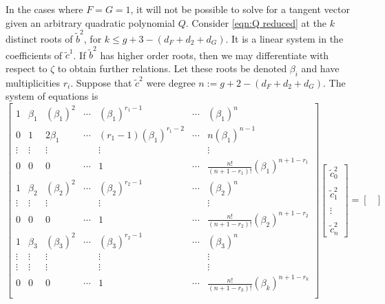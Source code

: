 In the cases where $F=G=1$, it will not be possible to solve for a tangent vector given an arbitrary quadratic polynomial $Q$. Consider \eqref{eqn:Q reduced} at the $k$ distinct roots of $\tilde{b}^2$, for $k \leq g + 3 - (d_F + d_2 + d_G)$. It is a linear system in the coefficients of $\tilde{c}^1$. If $\tilde{b}^2$ has higher order roots, then we may differentiate with respect to $ζ$ to obtain further relations. Let these roots be denoted $β_i$ and have multiplicities $r_i$. Suppose that $\tilde{c}^2$ were degree $n := g + 2 - (d_F + d_2 + d_G)$. The system of equations is
\[
\begin{bmatrix}
1 & β_1 & (β_1)^2 & \cdots & (β_1)^{r_1-1} & \cdots & (β_1)^{n} \\
0 & 1 & 2β_1 & \cdots & (r_1-1)(β_1)^{r_1-2} & \cdots & n(β_1)^{n-1} \\
\vdots & \vdots & \vdots & & \vdots & & \vdots \\
0 & 0 & 0 & \cdots & 1 & \cdots & \frac{n!}{(n+1 - r_1)!}(β_1)^{n+1-r_1} \\
1 & β_2 & (β_2)^2 & \cdots & (β_2)^{r_2-1} & \cdots & (β_2)^{n} \\
\vdots & \vdots & \vdots & & \vdots & & \vdots \\
0 & 0 & 0 & \cdots & 1 & \cdots & \frac{n!}{(n+1 - r_2)!}(β_2)^{n+1-r_2} \\
1 & β_3 & (β_3)^2 & \cdots & (β_3)^{r_2-1} & \cdots & (β_3)^{n} \\
\vdots & \vdots & \vdots & & \vdots & & \vdots \\
\vdots & \vdots & \vdots & & \vdots & & \vdots \\
0 & 0 & 0 & \cdots & 1 & \cdots & \frac{n!}{(n+1 - r_k)!}(β_k)^{n+1-r_k} \\
\end{bmatrix}
\begin{bmatrix}
\tilde{c}^2_0 \\~\\ \tilde{c}^2_1 \\~\\ \vdots \\~\\ \tilde{c}^2_n
\end{bmatrix}
=
\begin{bmatrix}

\end{bmatrix}\]
